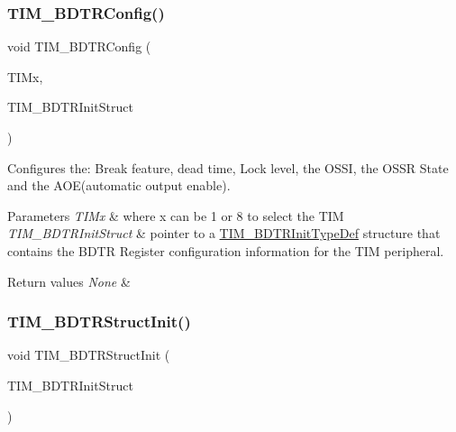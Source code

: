 \subsubsection{\texorpdfstring{TIM\_BDTRConfig()}{TIM\_BDTRConfig()}}
{\footnotesize\ttfamily void T\+I\+M\+\_\+\+B\+D\+T\+R\+Config (\begin{DoxyParamCaption}\item[{\mbox{\hyperlink{struct_t_i_m___type_def}{T\+I\+M\+\_\+\+Type\+Def}} $\ast$}]{T\+I\+Mx,  }\item[{\mbox{\hyperlink{struct_t_i_m___b_d_t_r_init_type_def}{T\+I\+M\+\_\+\+B\+D\+T\+R\+Init\+Type\+Def}} $\ast$}]{T\+I\+M\+\_\+\+B\+D\+T\+R\+Init\+Struct }\end{DoxyParamCaption})}



Configures the\+: Break feature, dead time, Lock level, the O\+S\+SI, the O\+S\+SR State and the A\+O\+E(automatic output enable). 


\begin{DoxyParams}{Parameters}
{\em T\+I\+Mx} & where x can be 1 or 8 to select the T\+IM \\
\hline
{\em T\+I\+M\+\_\+\+B\+D\+T\+R\+Init\+Struct} & pointer to a \mbox{\hyperlink{struct_t_i_m___b_d_t_r_init_type_def}{T\+I\+M\+\_\+\+B\+D\+T\+R\+Init\+Type\+Def}} structure that contains the B\+D\+TR Register configuration information for the T\+IM peripheral. \\
\hline
\end{DoxyParams}

\begin{DoxyRetVals}{Return values}
{\em None} & \\
\hline
\end{DoxyRetVals}
\mbox{\label{group___t_i_m___private___functions_gaea0f49938cda8ae0738162194798afc6}} 
\subsubsection{\texorpdfstring{TIM\_BDTRStructInit()}{TIM\_BDTRStructInit()}}
{\footnotesize\ttfamily void T\+I\+M\+\_\+\+B\+D\+T\+R\+Struct\+Init (\begin{DoxyParamCaption}\item[{\mbox{\hyperlink{struct_t_i_m___b_d_t_r_init_type_def}{T\+I\+M\+\_\+\+B\+D\+T\+R\+Init\+Type\+Def}} $\ast$}]{T\+I\+M\+\_\+\+B\+D\+T\+R\+Init\+Struct }\end{DoxyParamCaption})}




